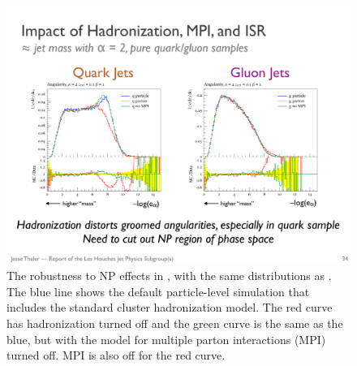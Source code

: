 \begin{figure}[t]
\begin{center}
\includegraphics[width = 0.99\columnwidth]{figures/robustness.pdf}
\end{center}
\caption{The robustness to NP effects in \herwig, with the same distributions as .
%
The blue line shows the default particle-level simulation that includes the standard cluster hadronization model.
%
The red curve has hadronization turned off and the green curve is the same as the blue, but with the \herwig model for multiple parton interactions (MPI) turned off.
%
MPI is also off for the red curve.}
\label{fig:robustness}
\end{figure}

